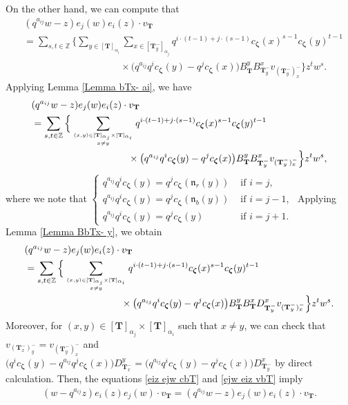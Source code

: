 \documentclass[12pt]{amsart}
\numberwithin{equation}{thm}
\newcommand\ZZ{\mathbb Z}
\newcommand\bT{\mathbf T}
\newcommand\fn{\mathfrak n}
\renewcommand\a{\alpha}  %
\newcommand\Bz{\boldsymbol\zeta}
\begin{document}
On the other hand, we can compute that 
\begin{align*}
&(q^{a_{ij}} w -z) e_j(w) e_i(z) \cdot v_{\bT} 
\\
&= \sum_{s,t \in \ZZ} \Big\{ 
	\sum_{y \in [\bT]_{\a_i}} \sum_{x \in [\bT_y^-]_{\a_j}} 
		q^{i \cdot (t-1) + j \cdot (s-1)} c_{\Bz} (x)^{s-1} c_{\Bz} (y)^{t-1} 
			\\ & \hspace{10em} \times 
			\big( q^{a_{ij}} q^i c_{\Bz} (y) - q^j c_{\Bz} (x) \big) B_{\bT}^y B_{\bT_y^-}^x v_{(\bT_y^-)_x^-} 
	\Big\} z^t w^s. 
\end{align*}
Applying Lemma \ref{Lemma bTx- ai}, we have 
\begin{align*}
&(q^{a_{ij}} w -z) e_j(w) e_i(z) \cdot v_{\bT} 
\\
&= \sum_{s,t \in \ZZ} \Big\{ 
	\sum_{(x,y) \in [\bT]_{\a_j} \times [\bT]_{\a_i} \atop x \not=y} 
		q^{i \cdot (t-1) + j \cdot (s-1)} c_{\Bz} (x)^{s-1} c_{\Bz} (y)^{t-1} 
			\\ & \hspace{10em} \times 
			\big( q^{a_{ij}} q^i c_{\Bz} (y) - q^j c_{\Bz} (x) \big) B_{\bT}^y B_{\bT_y^-}^x v_{(\bT_y^-)_x^-} 
	\Big\} z^t w^s,  
\end{align*}
where we note that 
$\begin{cases}
q^{a_{ij}} q^i c_{\Bz} (y) = q^j c_{\Bz} (\fn_r(y)) & \text{ if } i=j, 
\\
q^{a_{ij}} q^i c_{\Bz} (y) = q^j c_{\Bz} (\fn_b (y)) & \text{ if } i = j-1, 
\\
q^{a_{ij}} q^i c_{\Bz} (y) = q^j c_{\Bz} (y) & \text{ if } i =j+1.
\end{cases}$
Applying Lemma \ref{Lemma BbTx- y}, we obtain 
\begin{align}
\label{ejw eiz vbT} 
\begin{split}
&(q^{a_{ij}} w -z) e_j(w) e_i(z) \cdot v_{\bT} 
\\
&= \sum_{s,t \in \ZZ} \Big\{ 
	\sum_{(x,y) \in [\bT]_{\a_j} \times [\bT]_{\a_i} \atop x \not=y} 
		q^{i \cdot (t-1) + j \cdot (s-1)} c_{\Bz} (x)^{s-1} c_{\Bz} (y)^{t-1} 
			\\ & \hspace{10em} \times 
			\big( q^{a_{ij}} q^i c_{\Bz} (y) - q^j c_{\Bz} (x) \big) B_{\bT}^y B_{\bT}^x D_{\bT_y^-}^x v_{(\bT_y^-)_x^-} 
	\Big\} z^t w^s. 
\end{split}
\end{align}
Moreover, for $(x,y) \in [\bT]_{\a_j} \times [\bT]_{\a_i}$ such that $x \not=y$, 
we can check that  \break 
$v_{(\bT_x^-)_y^-} = v_{(\bT_y^-)_x^-}$ 
and 
$\big( q^i c_{\Bz} (y) - q^{a_{ij}} q^j c_{\Bz} (x) \big) D_{\bT_x^-}^y 
	= \big( q^{a_{ij}} q^i c_{\Bz} (y) - q^j c_{\Bz} (x) \big)D_{\bT_y^-}^x$ 
by direct calculation. 
Then, the equations \eqref{eiz ejw cbT} and \eqref{ejw eiz vbT} imply 
\begin{align*}
(w- q^{a_{ij}} z) e_i(z) e_j(w) \cdot v_{\bT}  = (q^{a_{ij}} w -z) e_j(w) e_i(z) \cdot v_{\bT}.
\end{align*}
\end{document}
